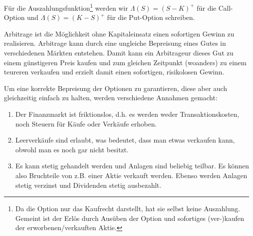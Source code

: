 Für die Auszahlungsfunktion\footnote{Da die Option nur das Kaufrecht darstellt, hat sie selbst keine Auszahlung. Gemeint ist der Erlös durch Ausüben der Option und sofortiges (ver-)kaufen der erworbenen/verkauften Aktie.} werden wir $\Lambda (S) = \left(S-K\right)^+$ für die Call-Option und $\Lambda (S) = \left(K-S\right)^+$ für die Put-Option schreiben.


\begin{Definition}[Arbitrage]
Arbitrage ist die Möglichkeit ohne Kapitaleinsatz einen sofortigen Gewinn zu realisieren. Arbitrage kann durch eine ungleiche Bepreisung eines Gutes in verschiedenen Märkten entstehen. Damit kann ein Arbitrageur dieses Gut zu einem günstigeren Preis kaufen und zum gleichen Zeitpunkt (woanders) zu einem teureren verkaufen und erzielt damit einen sofortigen, risikolosen Gewinn.
\end{Definition}


Um eine korrekte Bepreisung der Optionen zu garantieren, diese aber auch gleichzeitig einfach zu halten, werden verschiedene Annahmen gemacht:
\begin{enumerate}
\item Der Finanzmarkt ist friktionslos, d.h. es werden weder Transaktionskosten, noch Steuern für Käufe oder Verkäufe erhoben.
\item Leerverkäufe sind erlaubt, was bedeutet, dass man etwas verkaufen kann, obwohl man es noch gar nicht besitzt.
\item Es kann stetig gehandelt werden und Anlagen sind beliebig teilbar. Es können also Bruchteile von z.B. einer Aktie verkauft werden. Ebenso werden Anlagen stetig  verzinst und Dividenden stetig ausbezahlt.
\end{enumerate}




